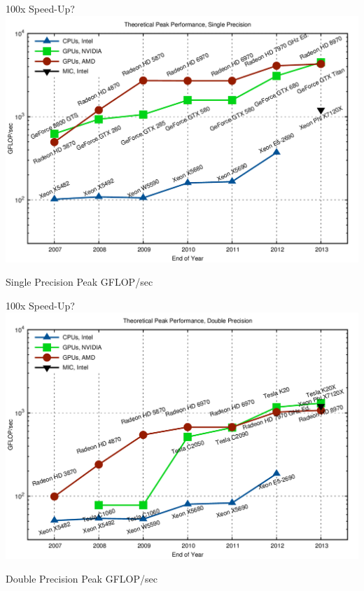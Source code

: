 
\begin{frame}{100x Speed-Up?}
 \includegraphics[width=\textwidth]{figures/gflops-sp}
 \begin{center}
  Single Precision Peak GFLOP/sec
 \end{center}
\end{frame}

\begin{frame}{100x Speed-Up?}
 \includegraphics[width=\textwidth]{figures/gflops-dp}
 \begin{center}
  Double Precision Peak GFLOP/sec
 \end{center}
\end{frame}

